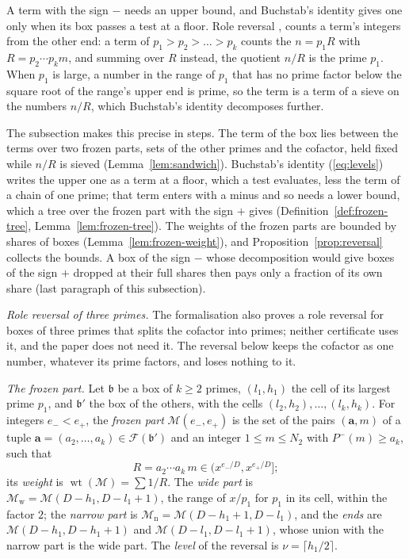 \documentclass[11pt]{article}
\theoremstyle{definition}
\begin{document}
A term with the sign $-$ needs an upper bound, and Buchstab's identity gives one only when its box passes a test at a
floor. Role reversal \cite{bhp}, \cite{harman} counts a term's integers from the other end: a term of $p_1 > p_2 > \dots
> p_k$ counts the $n = p_1 R$ with $R = p_2 \cdots p_k m$, and summing over $R$ instead, the quotient $n/R$ is the
prime $p_1$. When $p_1$ is large, a number in the range of $p_1$ that has no prime factor below the square root of the
range's upper end is prime, so the term is a term of a sieve on the numbers $n/R$, which Buchstab's identity
decomposes further.

The subsection makes this precise in steps. The term of the box lies between the terms over two frozen parts, sets of
the other primes and the cofactor, held fixed while $n/R$ is sieved (Lemma~\ref{lem:sandwich}). Buchstab's identity
(\ref{eq:levels}) writes the upper one as a term at a floor, which a test evaluates, less the term of a chain of one
prime; that term enters with a minus and so needs a lower bound, which a tree over the frozen part with the sign
$+$ gives
(Definition~\ref{def:frozen-tree}, Lemma~\ref{lem:frozen-tree}). The weights of the frozen parts are bounded by shares
of boxes (Lemma~\ref{lem:frozen-weight}), and Proposition~\ref{prop:reversal} collects the bounds. A box of the sign
$-$ whose decomposition would give boxes of the sign $+$ dropped at their full shares then pays only a fraction of its
own share (last paragraph of this subsection).

\emph{Role reversal of three primes.} The formalisation also proves a role reversal for boxes of three primes that
splits the cofactor into primes; neither certificate uses it, and the paper does not need it. The reversal below keeps
the cofactor as one number, whatever its prime factors, and loses nothing to it.

\emph{The frozen part.} Let $\mathfrak b$ be a box of $k \ge 2$ primes, $(l_1, h_1)$ the cell of its largest prime
$p_1$, and $\mathfrak b'$ the box of the others, with the cells $(l_2, h_2), \dots, (l_k, h_k)$. For integers $e_- <
e_+$, the \emph{frozen part} $\mathcal M(e_-, e_+)$ is the set of the pairs $(\mathbf a, m)$ of a tuple $\mathbf a =
(a_2,
\dots, a_k) \in \mathcal F(\mathfrak b')$ and an integer $1 \le m \le N_2$ with $P^-(m) \ge a_k$, such that
\[
  R = a_2 \cdots a_k\, m \in (x^{e_-/D}, x^{e_+/D}];
\]
its \emph{weight} is $\operatorname{wt}(\mathcal M) = \sum 1/R$. The \emph{wide part} is $\mathcal M_{\mathrm w} =
\mathcal M(D - h_1, D - l_1 + 1)$, the range of $x/p_1$ for
$p_1$ in its cell, within the factor $2$; the \emph{narrow part} is $\mathcal M_{\mathrm n} = \mathcal M(D - h_1 + 1, D
-
l_1)$, and the \emph{ends} are $\mathcal M(D - h_1, D - h_1 + 1)$ and $\mathcal M(D - l_1, D - l_1 + 1)$, whose union
with
the narrow part is the wide part. The \emph{level} of the reversal is $\nu = \lceil h_1/2 \rceil$.
\end{document}
